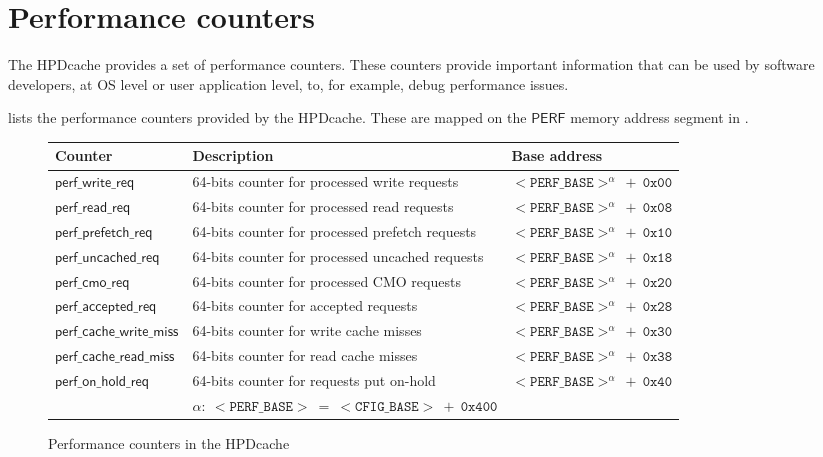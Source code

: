 \documentclass[10pt,titlepage,twoside]{book}
\begin{document}
\section{Performance counters}

The \ac{HPDcache} provides a set of performance counters.
These counters provide important information that can be used by software developers, at \ac{OS} level or user application level, to, for example, debug performance issues.

 lists the performance counters provided by the \ac{HPDcache}.
These are mapped on the $\mathsf{PERF}$ memory address segment in .

\begin{figure}[!htbp]
  \begin{center}
    \caption{Performance counters in the \ac*{HPDcache}}%
    {\footnotesize%
    \begin{tabular}{lll}
      \toprule
      \textbf{Counter}
      & \textbf{Description}
      & \textbf{Base address} \\
      \midrule
      $\mathsf{perf\_write\_req}$
      & 64-bits counter for processed write requests
      & $\mathtt{<PERF\_BASE>^\alpha~+~0x00}$\\
      \midrule
      $\mathsf{perf\_read\_req}$
      & 64-bits counter for processed read requests
      & $\mathtt{<PERF\_BASE>^\alpha~+~0x08}$\\
      \midrule
      $\mathsf{perf\_prefetch\_req}$
      & 64-bits counter for processed prefetch requests
      & $\mathtt{<PERF\_BASE>^\alpha~+~0x10}$\\
      \midrule
      $\mathsf{perf\_uncached\_req}$
      & 64-bits counter for processed uncached requests
      & $\mathtt{<PERF\_BASE>^\alpha~+~0x18}$\\
      \midrule
      $\mathsf{perf\_cmo\_req}$
      & 64-bits counter for processed \ac{CMO} requests
      & $\mathtt{<PERF\_BASE>^\alpha~+~0x20}$\\
      \midrule
      $\mathsf{perf\_accepted\_req}$
      & 64-bits counter for accepted requests
      & $\mathtt{<PERF\_BASE>^\alpha~+~0x28}$\\
      \midrule
      $\mathsf{perf\_cache\_write\_miss}$
      & 64-bits counter for write cache misses
      & $\mathtt{<PERF\_BASE>^\alpha~+~0x30}$\\
      \midrule
      $\mathsf{perf\_cache\_read\_miss}$
      & 64-bits counter for read cache misses
      & $\mathtt{<PERF\_BASE>^\alpha~+~0x38}$\\
      \midrule
      $\mathsf{perf\_on\_hold\_req}$
      & 64-bits counter for requests put on-hold
      & $\mathtt{<PERF\_BASE>^\alpha~+~0x40}$\\
      \bottomrule
      & $\mathtt{\alpha:~<PERF\_BASE>~=~<CFIG\_BASE>~+~0x400}$
      &
    \end{tabular}}
  \end{center}
\end{figure}
\end{document}
